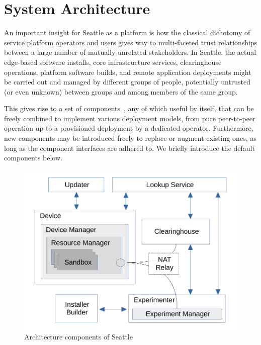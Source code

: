 \section{System Architecture}

An important insight for Seattle as a platform is how the classical
dichotomy of service platform operators and users gives way to multi-faceted
trust relationships between a large number of mutually-unrelated
stakeholders.
In Seattle, the actual edge-based software installs, core infrastructure
services, clearinghouse operations, platform software builds, and remote
application deployments might be carried out and managed by different
groups of people, potentially untrusted (or even unknown) between groups
and among members of the same group.

This gives rise to a set of components~\cite{Cappos2009},
any of which useful
by itself, that can be freely combined to implement various
deployment models, from pure peer-to-peer operation up to a
provisioned deployment by a dedicated operator. Furthermore,
new components may be introduced freely to replace or augment
existing ones, as long as the component interfaces are adhered to.
We briefly introduce the default components below.

\begin{figure}
  \centering
  \includegraphics[width=\columnwidth]{figures/components.pdf}
  \caption{Architecture components of Seattle}
  \label{fig:arch}
\end{figure}


